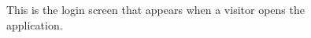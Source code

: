 \documentclass[12pt,titlepage]{article}
\begin{document}
\begin{figure}
\centering
{}
\caption{This is the login screen that appears when a visitor opens the application.}
\end{figure}
\clearpage
\newpage
\end{document}
